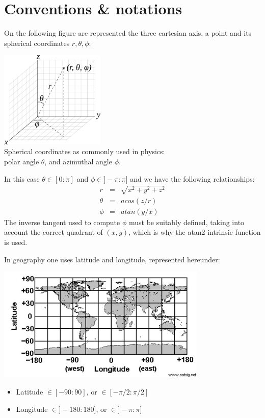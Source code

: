 \documentclass[a4paper]{article}
\begin{document}
\section{Conventions \& notations}

On the following figure are represented the three cartesian axis, 
a point and its spherical coordinates $r,\theta,\phi$:
\begin{center}
\includegraphics[width=5cm]{images/sphcoord}\\
{\small Spherical coordinates as commonly used in physics:\\ polar angle $\theta$, and azimuthal angle $\phi$.} 
\end{center}
In this case $\theta\in[0:\pi]$ and $\phi\in]-\pi:\pi]$ and we have the following relationships:
\begin{eqnarray}
r &=& \sqrt{x^2+y^2+z^2} \\
\theta &=& acos (z/r) \\
\phi &=& atan (y/x) 
\end{eqnarray}
The inverse tangent used to compute $\phi$ must be suitably defined, taking into account the correct quadrant of $(x,y)$,
which is why the atan2 intrinsic function is used.    

In geography one uses latitude and longitude, represented hereunder:
\begin{center}
\includegraphics[width=10cm]{images/map.jpg}
\end{center}
\begin{itemize}
\item Latitude  $\in[-90:90]$,   or $\in[-\pi/2:\pi/2]$ 
\item Longitude $\in]-180:180]$, or $\in]-\pi:\pi]$ 
\end{itemize}
\end{document}
